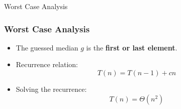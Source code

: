 \documentclass[10pt,aspectratio=43]{beamer}
\begin{document}
\begin{frame}{Worst Case Analysis}
\frametitle{Worst Case Analysis}
\begin{itemize}
    \item The guessed median \( g \) is the \textbf{first or last element}.
    \item Recurrence relation:
        \[
        T(n) = T(n-1) + cn
        \]
    \item Solving the recurrence:
        \[
        T(n) = \Theta(n^2)
        \]
\end{itemize}
\end{frame}

%
\end{document}
